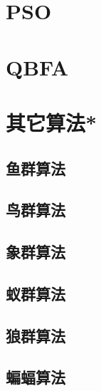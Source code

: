 {\section{PSO}

\section{QBFA}
\section{其它算法*}
\subsection{鱼群算法}
\subsection{鸟群算法}
\subsection{象群算法}
\subsection{蚁群算法}
\subsection{狼群算法}
\subsection{蝙蝠算法}
}
